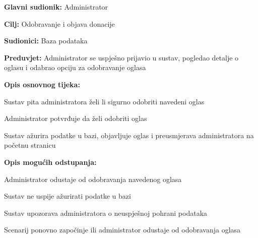 					\noindent {}
					\begin{packed_item}
	
						\item \textbf{Glavni sudionik: }Administrator
						\item  \textbf{Cilj:} Odobravanje i objava donacije
						\item  \textbf{Sudionici:} Baza podataka
						\item  \textbf{Preduvjet:} Administrator se uspješno prijavio u sustav, pogledao detalje o oglasu i odabrao opciju za odobravanje oglasa
						\eject
						\item  \textbf{Opis osnovnog tijeka:}
						
						\item[] \begin{packed_enum}
							\item Sustav pita administratora želi li sigurno odobriti navedeni oglas
							\item Administrator potvrđuje da želi odobriti oglas
							\item Sustav ažurira podatke u bazi, objavljuje oglas i preusmjerava administratora na početnu stranicu
						\end{packed_enum}

						\item  \textbf{Opis mogućih odstupanja:}

						\item[] \begin{packed_item}
							\item[2.a] Administrator odustaje od odobravanja navedenog oglasa
							\item[3.a] Sustav ne uspije ažurirati podatke u bazi
							\item[] \begin{packed_enum}
								\item Sustav upozorava administratora o neuspješnoj pohrani podataka
								\item Scenarij ponovno započinje ili administrator odustaje od odobravanja oglasa
							\end{packed_enum}					
						\end{packed_item}
					\end{packed_item}

